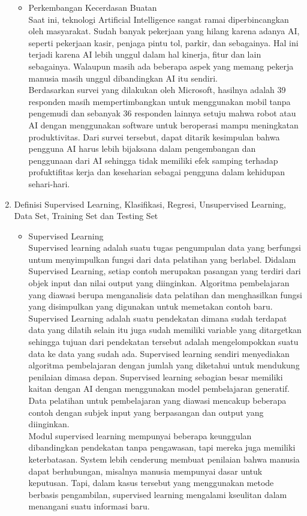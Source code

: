 \begin{enumerate}
\begin{itemize}
\item Perkembangan Kecerdasan Buatan\\
Saat ini, teknologi Artificial Intelligence sangat ramai diperbincangkan oleh masyarakat. Sudah banyak pekerjaan yang hilang karena adanya AI, seperti pekerjaan kasir, penjaga pintu tol, parkir, dan sebagainya. Hal ini terjadi karena AI lebih unggul dalam hal kinerja, fitur dan lain sebagainya. Walaupun masih ada beberapa aspek yang memang pekerja manusia masih unggul dibandingkan AI itu sendiri. \\
Berdasarkan survei yang dilakukan oleh Microsoft, hasilnya adalah 39 responden masih mempertimbangkan untuk menggunakan mobil tanpa pengemudi dan sebanyak 36 responden lainnya setuju mahwa robot atau AI dengan menggunakan software untuk beroperasi mampu meningkatan produktivitas. Dari survei tersebut, dapat ditarik kesimpulan bahwa pengguna AI harus lebih bijaksana dalam pengembangan dan penggunaan dari AI sehingga tidak memiliki efek samping terhadap profuktifitas kerja dan keseharian sebagai pengguna dalam kehidupan sehari-hari.

\end{itemize}

\item Definisi Supervised Learning, Klasifikasi, Regresi, Unsupervised Learning, Data Set, Training Set dan Testing Set
\begin{itemize}
\item Supervised Learning\\
Supervised learning adalah suatu tugas pengumpulan data yang berfungsi untum menyimpulkan fungsi dari data pelatihan yang berlabel. Didalam Supervised Learning, setiap contoh merupakan pasangan yang terdiri dari objek input dan nilai output yang diinginkan. Algoritma pembelajaran yang diawasi berupa menganalisis data pelatihan dan menghasilkan fungsi yang disimpulkan yang digunakan untuk memetakan contoh baru.\\
 	Supervised Learning adalah suatu pendekatan dimana sudah terdapat data yang dilatih selain itu juga sudah memiliki variable yang ditargetkan sehingga tujuan dari pendekatan tersebut adalah mengelompokkan suatu data ke data yang sudah ada. Supervised learning sendiri menyediakan algoritma pembelajaran dengan jumlah yang diketahui untuk mendukung penilaian dimasa depan. Supervised learning sebagian besar memiliki kaitan dengan AI dengan menggunakan model pembelajaran generatif. Data pelatihan untuk pembelajaran yang diawasi mencakup beberapa contoh dengan subjek input yang berpasangan dan output yang diinginkan.\\
 	Modul supervised learning mempunyai beberapa keunggulan dibandingkan pendekatan tanpa pengawasan, tapi mereka juga memiliki keterbatasan. System lebih cenderung membuat penilaian bahwa manusia dapat berhubungan, misalnya manusia mempunyai dasar untuk keputusan. Tapi, dalam kasus tersebut yang menggunakan metode berbasis pengambilan, supervised learning mengalami kseulitan dalam menangani suatu informasi baru. 


\end{itemize}
\end{enumerate}

